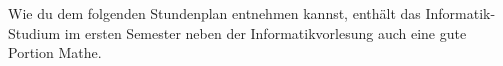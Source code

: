Wie du dem folgenden Stundenplan entnehmen kannst, enthält das Informatik-Studium im ersten
Semester neben der Informatikvorlesung auch eine gute Portion Mathe.
\vspace{-0.5cm}
\begin{center}



\end{center}
